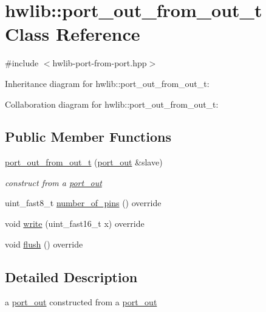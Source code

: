 \hypertarget{classhwlib_1_1port__out__from__out__t}{}\section{hwlib\+:\+:port\+\_\+out\+\_\+from\+\_\+out\+\_\+t Class Reference}
\label{classhwlib_1_1port__out__from__out__t}


{\ttfamily \#include $<$hwlib-\/port-\/from-\/port.\+hpp$>$}



Inheritance diagram for hwlib\+:\+:port\+\_\+out\+\_\+from\+\_\+out\+\_\+t\+:


Collaboration diagram for hwlib\+:\+:port\+\_\+out\+\_\+from\+\_\+out\+\_\+t\+:
\subsection*{Public Member Functions}
\begin{DoxyCompactItemize}
\item 
\mbox{\label{classhwlib_1_1port__out__from__out__t_aa1102493adbeba33502e366900b176ec}} 
\hyperlink{classhwlib_1_1port__out__from__out__t_aa1102493adbeba33502e366900b176ec}{port\+\_\+out\+\_\+from\+\_\+out\+\_\+t} (\hyperlink{classhwlib_1_1port__out}{port\+\_\+out} \&slave)
\begin{DoxyCompactList}\small\item\em construct from a \hyperlink{classhwlib_1_1port__out}{port\+\_\+out} \end{DoxyCompactList}\item 
uint\+\_\+fast8\+\_\+t \hyperlink{classhwlib_1_1port__out__from__out__t_a6e8205f2537103897083612c6d5f35a9}{number\+\_\+of\+\_\+pins} () override
\item 
void \hyperlink{classhwlib_1_1port__out__from__out__t_a42fc682057ea78b827900e95cb3e0d0c}{write} (uint\+\_\+fast16\+\_\+t x) override
\item 
void \hyperlink{classhwlib_1_1port__out__from__out__t_ab9caf29db8ef90afa7dfd645fd4f89f0}{flush} () override
\end{DoxyCompactItemize}


\subsection{Detailed Description}
a \hyperlink{classhwlib_1_1port__out}{port\+\_\+out} constructed from a \hyperlink{classhwlib_1_1port__out}{port\+\_\+out}

